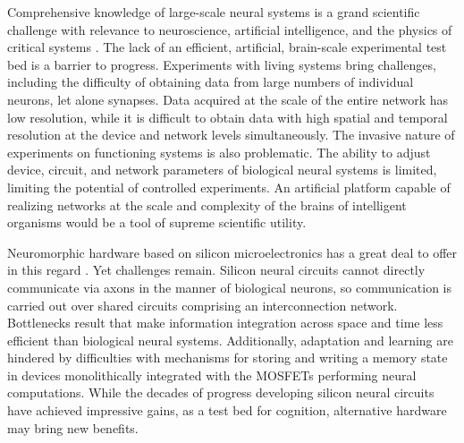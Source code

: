 \documentclass[twocolumn]{article}
\begin{document}
Comprehensive knowledge of large-scale neural systems is a grand scientific challenge with relevance to neuroscience, artificial intelligence, and the physics of critical systems \cite{elst2012,ized2008,br2017,fama2019,eide2019}. The lack of an efficient, artificial, brain-scale experimental test bed is a barrier to progress. Experiments with living systems bring challenges, including the difficulty of obtaining data from large numbers of individual neurons, let alone synapses. Data acquired at the scale of the entire network has low resolution, while it is difficult to obtain data with high spatial and temporal resolution at the device and network levels simultaneously. The invasive nature of experiments on functioning systems is also problematic. The ability to adjust device, circuit, and network parameters of biological neural systems is limited, limiting the potential of controlled experiments. An artificial platform capable of realizing networks at the scale and complexity of the brains of intelligent organisms would be a tool of supreme scientific utility.

Neuromorphic hardware based on silicon microelectronics has a great deal to offer in this regard \cite{me1989,lide2015,chba2003,inch2006,voma2007,inli2011,cryu2012,cage2013,pfgr2013,bega2014,fu2016,moqi2018}. Yet challenges remain. Silicon neural circuits cannot directly communicate via axons in the manner of biological neurons, so communication is carried out over shared circuits comprising an interconnection network. Bottlenecks result that make information integration across space and time less efficient than biological neural systems. Additionally, adaptation and learning are hindered by difficulties with mechanisms for storing and writing a memory state in devices monolithically integrated with the MOSFETs performing neural computations. While the decades of progress developing silicon neural circuits have achieved impressive gains, as a test bed for cognition, alternative hardware may bring new benefits.
\end{document}
